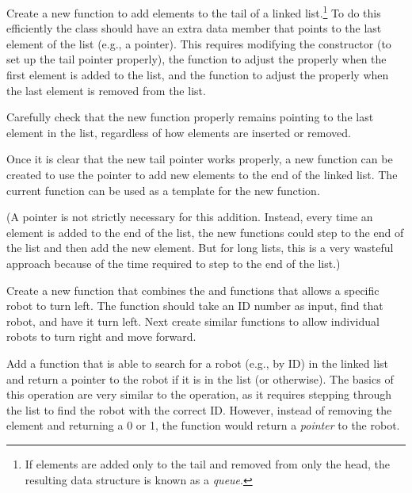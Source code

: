 Create a new function to add elements to the tail of a linked list.\footnote{If elements are added only to the tail and removed  from only the head, the resulting data structure is known as a \emph{queue}.} To do this efficiently the  class should have an extra data member that points to the last element of the list (e.g., a  pointer).  This requires modifying the constructor (to set up the tail pointer properly), the  function to adjust the  properly when the first element is added to the list, and the  function to adjust the  properly when the last element is removed from the list.  

Carefully check that the new  function properly remains pointing to the last element in the list, regardless of how elements are inserted or removed.  

Once it is clear that the new tail pointer works properly, a new function can be created to use the  pointer to add new elements to the end of the linked list.  The current  function can be used as a template for the new function.  

(A  pointer is not strictly necessary for this addition.  Instead, every time an element is added to the end of the list, the new functions could step to the end of the list and then add the new element.  But for long lists, this is a very wasteful approach because of the time required to step to the end of the list.)



Create a new function that combines the  and  functions that allows a specific robot to turn left.  The function should take an ID number as input, find that robot, and have it turn left.  Next create similar functions to allow individual robots to turn right and move forward.



Add a function that is able to search for a robot (e.g., by ID) in the linked list and return a pointer to the robot if it is in the list (or  otherwise).  The basics of this operation are very similar to the  operation, as it requires stepping through the list to find the robot with the correct ID.   However, instead of removing the element and returning a 0 or 1, the function would return a \emph{pointer} to the robot.  

